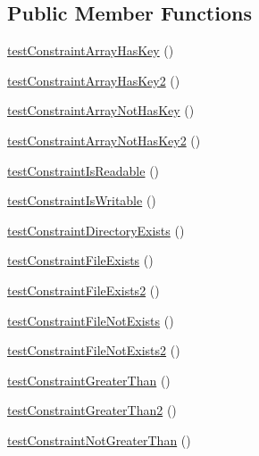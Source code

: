 \subsection*{Public Member Functions}
\begin{DoxyCompactItemize}
\item 
\mbox{\hyperlink{class_framework___constraint_test_abc601d58edcc82798cd4e40acca5542d}{test\+Constraint\+Array\+Has\+Key}} ()
\item 
\mbox{\hyperlink{class_framework___constraint_test_a04f7047eaeda474f5812561a316018fb}{test\+Constraint\+Array\+Has\+Key2}} ()
\item 
\mbox{\hyperlink{class_framework___constraint_test_aa5a9d54e917d0822e45c1690c4dcbd16}{test\+Constraint\+Array\+Not\+Has\+Key}} ()
\item 
\mbox{\hyperlink{class_framework___constraint_test_aafb716dde80327aedb27a92145a021ef}{test\+Constraint\+Array\+Not\+Has\+Key2}} ()
\item 
\mbox{\hyperlink{class_framework___constraint_test_a0af55792f39aae46f97b749791bf59b5}{test\+Constraint\+Is\+Readable}} ()
\item 
\mbox{\hyperlink{class_framework___constraint_test_a2bad41afcac6e1c532cd66a44f6613fb}{test\+Constraint\+Is\+Writable}} ()
\item 
\mbox{\hyperlink{class_framework___constraint_test_a316092a7f6e3cf91248a1d5c80c47f62}{test\+Constraint\+Directory\+Exists}} ()
\item 
\mbox{\hyperlink{class_framework___constraint_test_a3d8f1c486dd0eb494020b6bbac9156a4}{test\+Constraint\+File\+Exists}} ()
\item 
\mbox{\hyperlink{class_framework___constraint_test_a4d71f93a4c01afa03b22ae8abb1daa46}{test\+Constraint\+File\+Exists2}} ()
\item 
\mbox{\hyperlink{class_framework___constraint_test_a6df906e7df15aefabb932a9aab70ebaa}{test\+Constraint\+File\+Not\+Exists}} ()
\item 
\mbox{\hyperlink{class_framework___constraint_test_a5fed76c1217401caafed2ed2145b710c}{test\+Constraint\+File\+Not\+Exists2}} ()
\item 
\mbox{\hyperlink{class_framework___constraint_test_a97ea412e5eb8d2ac9168d12dacee75aa}{test\+Constraint\+Greater\+Than}} ()
\item 
\mbox{\hyperlink{class_framework___constraint_test_a437c7c58539dc759b5101be0c9a440e1}{test\+Constraint\+Greater\+Than2}} ()
\item 
\mbox{\hyperlink{class_framework___constraint_test_ac6291c748c4841b299f0fa4b5b5a0de2}{test\+Constraint\+Not\+Greater\+Than}} ()

\end{DoxyCompactItemize}
